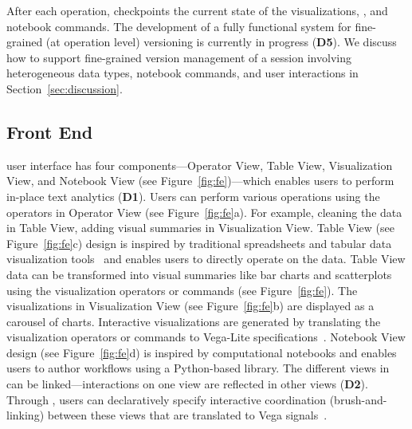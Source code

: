 
After each operation, \system checkpoints the current state of the visualizations, \vitaframe, and notebook commands. The development of a fully functional system for fine-grained (\ie at operation level) versioning is currently in progress (\textbf{D5}). 
 We discuss how to support fine-grained version management of a \vita session involving heterogeneous data types, notebook commands, and user interactions in
 Section~\ref{sec:discussion}.



\subsection{\system Front End}\label{sec:ui}
\system user interface has four components---Operator View, Table View, Visualization View, and Notebook View (see Figure~\ref{fig:fe})---which enables users to perform in-place text analytics (\textbf{D1}). Users can perform various \vita operations using the operators in Operator View (see Figure~\ref{fig:fe}a). For example, cleaning the data in Table View, adding visual summaries in Visualization View. Table View (see Figure~\ref{fig:fe}c) design is inspired by traditional spreadsheets and tabular data visualization tools~\cite{spenke1996focus} and enables users to directly operate on the data.
Table View data can be transformed into visual summaries like bar charts and scatterplots using the visualization operators or \vta commands (see Figure~\ref{fig:fe}). 
The visualizations in Visualization View (see Figure~\ref{fig:fe}b) are displayed as a carousel of charts. Interactive visualizations are generated by translating the visualization operators or commands to Vega-Lite specifications~\cite{satyanarayan2016vega}.
Notebook View design (see Figure~\ref{fig:fe}d) is inspired by computational notebooks and enables users to author \vita workflows using a Python-based \vta library. The different views in \system can be linked---interactions on one view are reflected in other views (\textbf{D2}). Through \vta, users can declaratively specify interactive coordination (\eg brush-and-linking) between these views that are translated to Vega signals~\cite{satyanarayan2015reactive}. 



